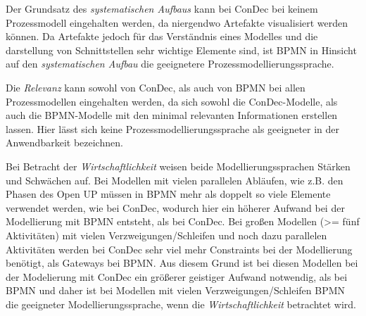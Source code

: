 Der  Grundsatz des \textit{systematischen Aufbaus} kann bei ConDec bei keinem Prozessmodell eingehalten werden, da niergendwo Artefakte visualisiert werden können. Da Artefakte jedoch für das Verständnis eines Modelles und die darstellung von Schnittstellen sehr wichtige Elemente sind, ist BPMN in Hinsicht auf den \textit{systematischen Aufbau} die geeignetere Prozessmodellierungssprache. \newline


Die \textit{Relevanz} kann sowohl von ConDec, als auch von BPMN bei allen Prozessmodellen eingehalten werden, da sich sowohl die ConDec-Modelle, als auch die BPMN-Modelle mit den minimal relevanten Informationen erstellen lassen. Hier lässt sich keine Prozessmodellierungssprache als geeigneter in der Anwendbarkeit  bezeichnen.\newline

Bei Betracht der \textit{Wirtschaftlichkeit} weisen beide Modellierungssprachen Stärken und Schwächen auf. Bei Modellen mit vielen parallelen Abläufen, wie z.B. den Phasen des Open UP müssen in BPMN mehr als doppelt so viele Elemente verwendet werden, wie bei ConDec, wodurch hier ein höherer Aufwand bei der Modellierung mit BPMN entsteht, als bei ConDec.\newline
Bei großen Modellen (>= fünf Aktivitäten) mit vielen Verzweigungen/Schleifen und noch dazu parallelen Aktivitäten werden bei ConDec sehr viel mehr Constraints bei der Modellierung benötigt, als Gateways bei BPMN. Aus diesem Grund ist bei diesen Modellen bei der Modelierung mit ConDec ein größerer geistiger Aufwand notwendig, als bei BPMN und daher ist bei Modellen mit vielen Verzweigungen/Schleifen BPMN die geeigneter Modellierungssprache, wenn die \textit{Wirtschaftlichkeit} betrachtet wird.\newline

